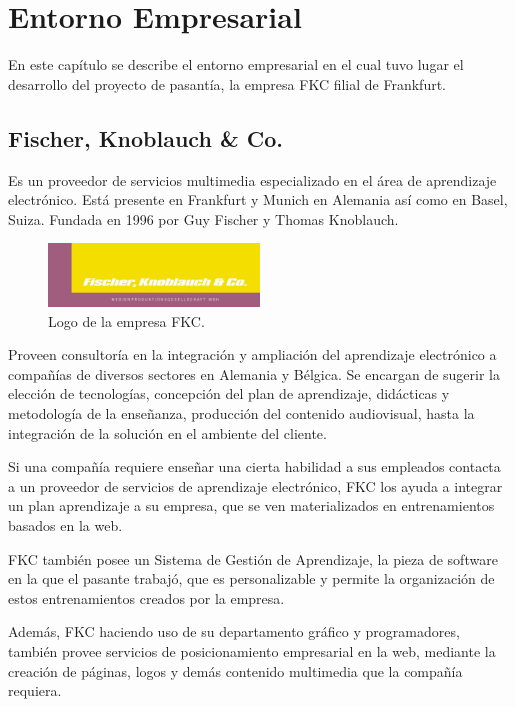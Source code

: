 \chapter{Entorno Empresarial}
\thispagestyle{empty} %

En este capítulo se describe el entorno empresarial en el cual tuvo lugar el desarrollo del proyecto de pasantía, la empresa \gls{FKC} filial de Frankfurt.

\section{Fischer, Knoblauch \& Co.}

Es un proveedor de servicios multimedia especializado en el área de aprendizaje electrónico. Está presente en Frankfurt y Munich en Alemania así como en Basel, Suiza. Fundada en 1996 por Guy Fischer y Thomas Knoblauch.

\begin{figure}[h]
	\begin{center}
		\includegraphics[width=0.5\textwidth]{logos/logoFKC.jpg}
		\caption{Logo de la empresa \gls{FKC}.} \label{fig:logoFKC}
	\end{center}
\end{figure}


Proveen consultoría en la integración y ampliación del aprendizaje electrónico a compañías de diversos sectores en Alemania y Bélgica. Se encargan de sugerir la elección de tecnologías, concepción del plan de aprendizaje, didácticas y metodología de la enseñanza, producción del contenido audiovisual, hasta la integración de la solución en el ambiente del cliente. 

Si una compañía requiere enseñar una cierta habilidad a sus empleados contacta a un proveedor de servicios de aprendizaje electrónico, \gls{FKC} los ayuda a integrar un plan aprendizaje a su empresa, que se ven materializados en entrenamientos basados en la web. 

\gls{FKC} también posee un Sistema de Gestión de Aprendizaje, la pieza de software en la que el pasante trabajó, que es personalizable y permite la organización de estos entrenamientos creados por la empresa.

Además, \gls{FKC} haciendo uso de su departamento gráfico y programadores, también provee servicios de posicionamiento empresarial en la web, mediante la creación de páginas, logos y demás contenido multimedia que la compañía requiera. 

